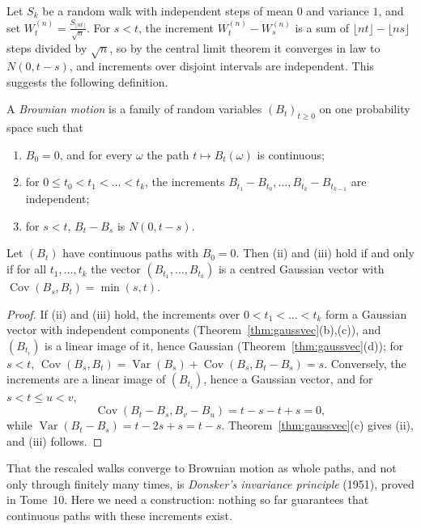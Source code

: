 Let $S_k$ be a random walk with independent steps of mean $0$ and variance $1$, and set $W^{(n)}_t=\frac{S_{\lfloor nt\rfloor}}{\sqrt n}$. For $s<t$, the increment
$W^{(n)}_t-W^{(n)}_s$ is a sum of $\lfloor nt\rfloor-\lfloor ns\rfloor$ steps divided by $\sqrt n$, so by the central limit theorem it converges in law to $N(0,t-s)$, and
increments over disjoint intervals are independent. This suggests the following definition.

\begin{definition}\label{def:bm}
A \emph{Brownian motion} is a family of random variables $(B_t)_{t\ge0}$ on one probability space such that
\begin{enumerate}[label=(\roman*)]
\item $B_0=0$, and for every $\omega$ the path $t\mapsto B_t(\omega)$ is continuous;
\item for $0\le t_0<t_1<\dots<t_k$, the increments $B_{t_1}-B_{t_0},\dots,B_{t_k}-B_{t_{k-1}}$ are independent;
\item for $s<t$, $B_t-B_s$ is $N(0,t-s)$.
\end{enumerate}
\end{definition}

\begin{proposition}\label{prop:bmgauss}
Let $(B_t)$ have continuous paths with $B_0=0$. Then (ii) and (iii) hold if and only if for all $t_1,\dots,t_k$ the vector $(B_{t_1},\dots,B_{t_k})$ is a centred Gaussian
vector with $\operatorname{Cov}(B_s,B_t)=\min(s,t)$.
\end{proposition}
\begin{proof}
If (ii) and (iii) hold, the increments over $0<t_1<\dots<t_k$ form a Gaussian vector with independent components (Theorem~\ref{thm:gaussvec}(b),(c)), and $(B_{t_i})$
is a linear image of it, hence Gaussian (Theorem~\ref{thm:gaussvec}(d)); for $s<t$, $\operatorname{Cov}(B_s,B_t)=\operatorname{Var}(B_s)+\operatorname{Cov}(B_s,B_t-B_s)=s$. Conversely, the increments are a
linear image of $(B_{t_i})$, hence a Gaussian vector, and for $s<t\le u<v$,
\[
\operatorname{Cov}(B_t-B_s,B_v-B_u)=t-s-t+s=0,
\]
while $\operatorname{Var}(B_t-B_s)=t-2s+s=t-s$. Theorem~\ref{thm:gaussvec}(c) gives (ii), and (iii) follows.
\end{proof}

That the rescaled walks converge to Brownian motion as whole paths, and not only through finitely many times, is
\emph{Donsker's invariance principle} (1951), proved in Tome~10. Here we need a construction: nothing so far guarantees that
continuous paths with these increments exist.

